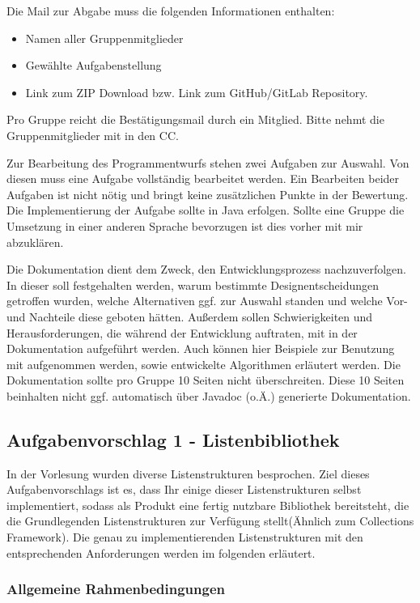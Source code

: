 \documentclass[a4paper,
			   fontsize=12pt]{article}
\begin{document}
Die Mail zur Abgabe muss die folgenden Informationen enthalten:
\begin{itemize}
	\item Namen aller Gruppenmitglieder
	\item Gewählte Aufgabenstellung
	\item Link zum ZIP Download bzw. Link zum GitHub/GitLab Repository.
\end{itemize}
Pro Gruppe reicht die Bestätigungsmail durch ein Mitglied. Bitte nehmt die Gruppenmitglieder mit in den CC.

Zur Bearbeitung des Programmentwurfs stehen zwei Aufgaben zur Auswahl. Von diesen muss eine Aufgabe vollständig bearbeitet werden. Ein Bearbeiten beider Aufgaben
ist nicht nötig und bringt keine zusätzlichen Punkte in der Bewertung. Die Implementierung der Aufgabe sollte in Java erfolgen. Sollte eine Gruppe die Umsetzung in
einer anderen Sprache bevorzugen ist dies vorher mit mir abzuklären.

Die Dokumentation dient dem Zweck, den Entwicklungsprozess nachzuverfolgen. In dieser soll festgehalten werden, warum bestimmte Designentscheidungen getroffen
wurden, welche Alternativen ggf. zur Auswahl standen und welche Vor- und Nachteile diese geboten hätten. Außerdem sollen Schwierigkeiten und Herausforderungen, 
die während der Entwicklung auftraten, mit in der Dokumentation aufgeführt werden. Auch können hier Beispiele zur Benutzung mit aufgenommen werden, sowie entwickelte 
Algorithmen erläutert werden. Die Dokumentation sollte pro Gruppe 10 Seiten nicht überschreiten. Diese 10 Seiten beinhalten nicht ggf. automatisch über Javadoc (o.Ä.) generierte Dokumentation.

\newpage

\subsection*{Aufgabenvorschlag 1 - Listenbibliothek}

In der Vorlesung wurden diverse Listenstrukturen besprochen. Ziel dieses Aufgabenvorschlags ist es, dass Ihr einige dieser Listenstrukturen selbst implementiert, sodass als Produkt eine 
fertig nutzbare Bibliothek bereitsteht, die die Grundlegenden Listenstrukturen zur Verfügung stellt(Ähnlich zum Collections Framework). Die genau zu implementierenden Listenstrukturen mit
den entsprechenden Anforderungen werden im folgenden erläutert.

\subsubsection*{Allgemeine Rahmenbedingungen}
\end{document}
